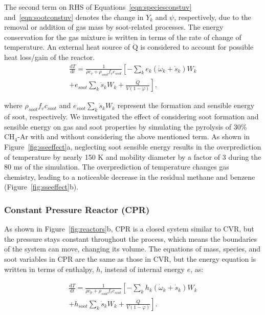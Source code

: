 The second term on RHS of Equations~\eqref{eqn:speciesconstuv} and~\eqref{eqn:sootconstuv} denotes the change in $Y_k$ and $\psi$, respectively, due to the removal or addition of gas mass by soot-related processes.
The energy conservation for the gas mixture is written in terms of the rate of change of temperature. An external heat source of $\mathrm{\dot{Q}}$ is considered to account for possible heat loss/gain of the reactor.
\begin{equation}
	\begin{split}
		\frac{\mathrm{d} T}{\mathrm{d} t}=
		\frac{1}{\rho c_v+\rho_{soot}f_v c_{soot}}
		\left[
			-\sum_k e_k
				\left(
					\dot{\omega}_k+\dot{s}_k
				\right) W_k
		\right. \\
		\left.
			+e_{soot}\sum_k \dot{s}_k W_k
			+\frac{\dot{Q}}{V(1-\varphi)}
		\right],
	\end{split}
	\label{eqn:energyconstuv}
\end{equation}

\noindent where $\rho_{soot}f_v c_{soot}$ and $e_{soot}\sum_k \dot{s}_k W_k$ represent the formation and sensible energy of soot, respectively. We investigated the effect of considering soot formation and sensible energy on gas and soot properties by simulating the pyrolysis of 30\%~$\mathrm{CH_4}$-Ar with and without considering the above mentioned term. As shown in Figure~\ref{fig:sseeffect}a, neglecting soot sensible energy results in the overprediction of temperature by nearly 150 K and mobility diameter by a factor of 3 during the 80 ms of the simulation. The overprediction of temperature changes gas chemistry, leading to a noticeable decrease in the residual methane and benzene (Figure~\ref{fig:sseeffect}b).




\subsubsection{Constant Pressure Reactor (CPR)}

As shown in Figure~\ref{fig:reactors}b, CPR is a closed system similar to CVR, but the pressure stays constant throughout the process, which means the boundaries of the system can move, changing its volume. The equations of mass, species, and soot variables in CPR are the same as those in CVR, but the energy equation is written in terms of enthalpy, $h$, instead of internal energy $e$, as:

\begin{equation}
	\begin{split}
		\frac{\mathrm{d} T}{\mathrm{d} t}=
		\frac{1}{\rho c_p+\rho_{soot}f_v c_{soot}}
		\left[
		-\sum_k h_k
		\left(
		\dot{\omega}_k+\dot{s}_k
		\right) W_k \right. \\
		\left.
		+h_{soot}\sum_k \dot{s}_k W_k
		+\frac{\dot{Q}}{V(1-\varphi)}
		\right]
		\label{eqn:energypressure}.
	\end{split}
\end{equation}

